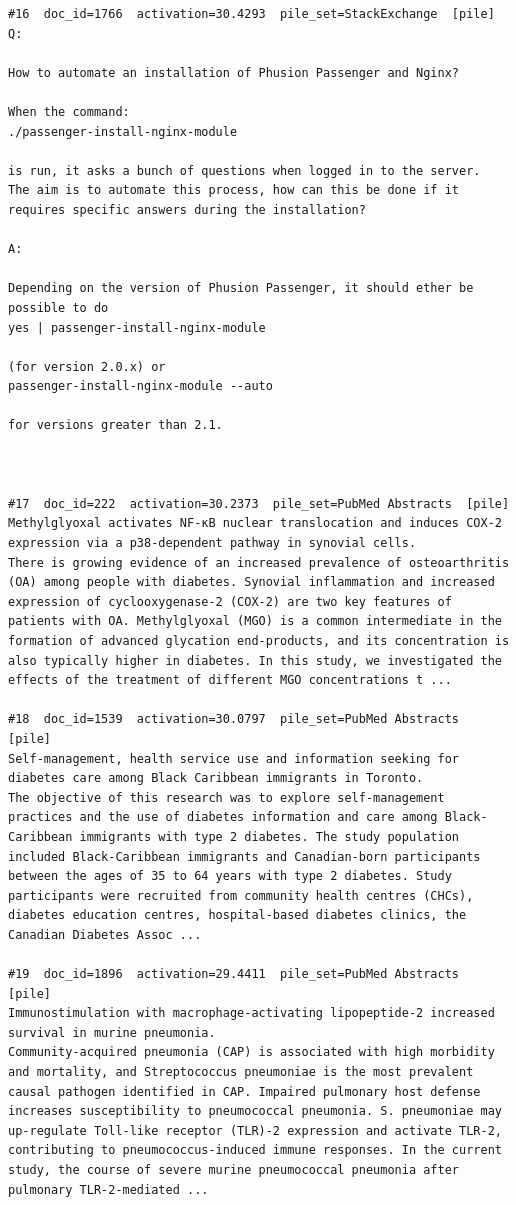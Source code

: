 \begin{verbatim}
#16  doc_id=1766  activation=30.4293  pile_set=StackExchange  [pile]
Q:

How to automate an installation of Phusion Passenger and Nginx?

When the command:
./passenger-install-nginx-module

is run, it asks a bunch of questions when logged in to the server.
The aim is to automate this process, how can this be done if it requires specific answers during the installation?

A:

Depending on the version of Phusion Passenger, it should ether be possible to do
yes | passenger-install-nginx-module

(for version 2.0.x) or
passenger-install-nginx-module --auto

for versions greater than 2.1.



#17  doc_id=222  activation=30.2373  pile_set=PubMed Abstracts  [pile]
Methylglyoxal activates NF-κB nuclear translocation and induces COX-2 expression via a p38-dependent pathway in synovial cells.
There is growing evidence of an increased prevalence of osteoarthritis (OA) among people with diabetes. Synovial inflammation and increased expression of cyclooxygenase-2 (COX-2) are two key features of patients with OA. Methylglyoxal (MGO) is a common intermediate in the formation of advanced glycation end-products, and its concentration is also typically higher in diabetes. In this study, we investigated the effects of the treatment of different MGO concentrations t ...

#18  doc_id=1539  activation=30.0797  pile_set=PubMed Abstracts  [pile]
Self-management, health service use and information seeking for diabetes care among Black Caribbean immigrants in Toronto.
The objective of this research was to explore self-management practices and the use of diabetes information and care among Black-Caribbean immigrants with type 2 diabetes. The study population included Black-Caribbean immigrants and Canadian-born participants between the ages of 35 to 64 years with type 2 diabetes. Study participants were recruited from community health centres (CHCs), diabetes education centres, hospital-based diabetes clinics, the Canadian Diabetes Assoc ...

#19  doc_id=1896  activation=29.4411  pile_set=PubMed Abstracts  [pile]
Immunostimulation with macrophage-activating lipopeptide-2 increased survival in murine pneumonia.
Community-acquired pneumonia (CAP) is associated with high morbidity and mortality, and Streptococcus pneumoniae is the most prevalent causal pathogen identified in CAP. Impaired pulmonary host defense increases susceptibility to pneumococcal pneumonia. S. pneumoniae may up-regulate Toll-like receptor (TLR)-2 expression and activate TLR-2, contributing to pneumococcus-induced immune responses. In the current study, the course of severe murine pneumococcal pneumonia after pulmonary TLR-2-mediated ...


\end{verbatim}
